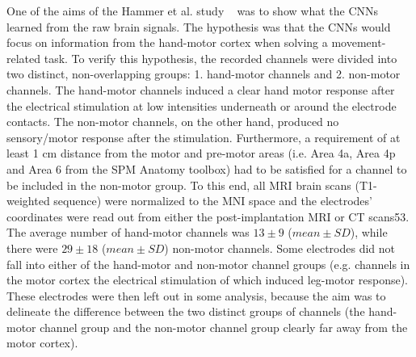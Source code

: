 One of the aims of the Hammer et al. study ~\cite{Hammer-2021} was to show what the CNNs learned from the raw brain signals.
The hypothesis was that the CNNs would focus on information from the hand-motor cortex when solving a movement-related task.
To verify this hypothesis, the recorded channels were divided into two distinct, non-overlapping groups: 1. hand-motor channels and 2. non-motor channels.
The hand-motor channels induced a clear hand motor response after the electrical stimulation at low intensities underneath or around the electrode contacts.
The non-motor channels, on the other hand, produced no sensory/motor response after the stimulation.
Furthermore, a requirement of at least 1 cm distance from the motor and pre-motor areas (i.e. Area 4a, Area 4p and Area 6 from the SPM Anatomy toolbox\cite{eickhoff-new-2005}) had to be satisfied for a channel to be included in the non-motor group.
To this end, all MRI brain scans (T1-weighted sequence) were normalized to the MNI space and the electrodes' coordinates were read out from either the post-implantation MRI or CT scans53. \\

The average number of hand-motor channels was $13 \pm 9$ ($mean \pm SD$), while there were $29 \pm 18$ ($mean \pm SD$) non-motor channels.
Some electrodes did not fall into either of the hand-motor and non-motor channel groups (e.g. channels in the motor cortex the electrical stimulation of which induced leg-motor response).
These electrodes were then left out in some analysis, because the aim was to delineate the difference between the two distinct groups of channels (the hand-motor channel group and the non-motor channel group clearly far away from the motor cortex).



